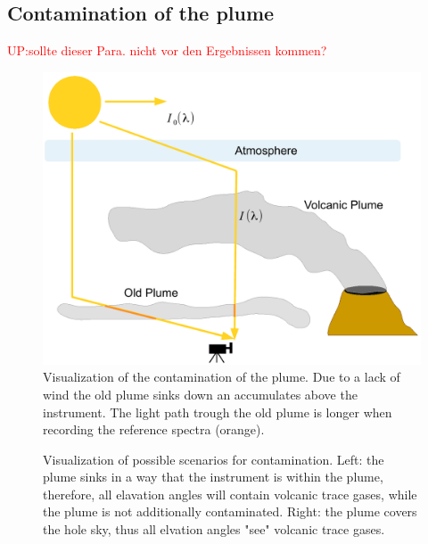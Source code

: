 \documentclass  [
  paper    = a4,
  BCOR     = 10mm,
  twoside,
  fontsize = 12pt,
  fleqn,
  toc      = bibnumbered,
  toc      = listofnumbered,
  numbers  = noendperiod,
  headings = normal,
  listof   = leveldown,
  version  = 3.03
]                                       {scrreprt}
\begin{document}
	\subsection{Contamination of the plume}
	\textcolor{red}{UP:sollte dieser Para. nicht vor den Ergebnissen kommen?}
	\begin{figure}
		\centering
		\includegraphics[width=0.7\linewidth]{Bilder/Contaminationplume}
		\caption{Visualization of the contamination of the plume. Due to a lack of wind the old plume sinks down an accumulates
		above the instrument. The light path trough the old plume is longer when recording the reference spectra (orange).}
		\label{fig:contaminationplume}
	\end{figure}
		\begin{figure}
			\centering
			\caption{Visualization of possible scenarios for contamination. Left: the plume sinks in a way that the instrument is within the plume, therefore, all elavation angles will contain volcanic trace gases, while the plume is not additionally contaminated. Right: the plume covers the hole sky, thus all elvation angles "see" volcanic trace gases. }
			\label{fig:contaminationplumewideplume}
		\end{figure}
\end{document}
